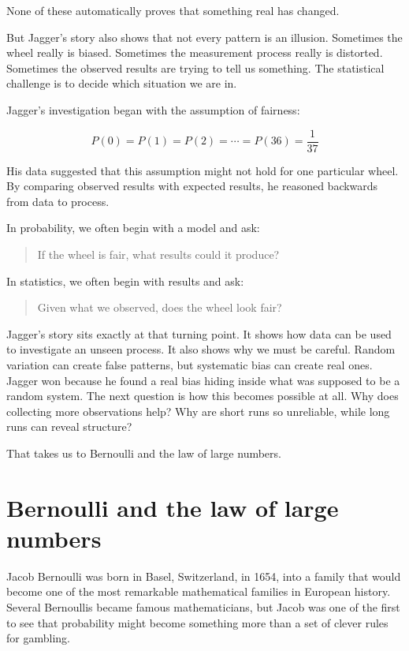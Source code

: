 \documentclass[
  letterpaper,
  DIV=11,
  numbers=noendperiod]{scrreprt}
\begin{document}
\begin{tcolorbox}
None of these automatically proves that something real has changed.

But Jagger's story also shows that not every pattern is an illusion.
Sometimes the wheel really is biased. Sometimes the measurement process
really is distorted. Sometimes the observed results are trying to tell
us something. The statistical challenge is to decide which situation we
are in.

Jagger's investigation began with the assumption of fairness:

\[
P(0) = P(1) = P(2) = \cdots = P(36) = \frac{1}{37}
\]

His data suggested that this assumption might not hold for one
particular wheel. By comparing observed results with expected results,
he reasoned backwards from data to process.

In probability, we often begin with a model and ask:

\begin{quote}
If the wheel is fair, what results could it produce?
\end{quote}

In statistics, we often begin with results and ask:

\begin{quote}
Given what we observed, does the wheel look fair?
\end{quote}

Jagger's story sits exactly at that turning point. It shows how data can
be used to investigate an unseen process. It also shows why we must be
careful. Random variation can create false patterns, but systematic bias
can create real ones. Jagger won because he found a real bias hiding
inside what was supposed to be a random system. The next question is how
this becomes possible at all. Why does collecting more observations
help? Why are short runs so unreliable, while long runs can reveal
structure?

That takes us to Bernoulli and the law of large numbers.

\end{tcolorbox}

\section{Bernoulli and the law of large
numbers}\label{bernoulli-and-the-law-of-large-numbers}

Jacob Bernoulli was born in Basel, Switzerland, in 1654, into a family
that would become one of the most remarkable mathematical families in
European history. Several Bernoullis became famous mathematicians, but
Jacob was one of the first to see that probability might become
something more than a set of clever rules for gambling.
\end{document}
